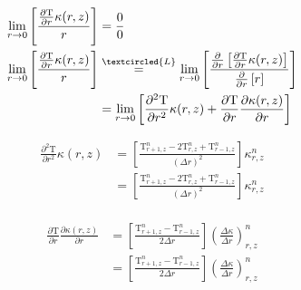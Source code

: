 \documentclass[12pt]{article}
\begin{document}
      \begin{equation}
        \begin{aligned}
          \lim_{r\rightarrow 0} \left [ \frac{\frac{\partial\mathrm{T}}{\partial r}\kappa(r, z)}{r} \right ] &= \frac{0}{0} \\
          \lim_{r\rightarrow 0} \left [ \frac{\frac{\partial\mathrm{T}}{\partial r}\kappa(r, z)}{r} \right ] &\overset{\textcircled{L}}= \lim_{r\rightarrow 0} \left [ \frac{\frac{\partial}{\partial r} \left [\frac{\partial\mathrm{T}}{\partial r}\kappa(r, z)  \right ]}{\frac{\partial}{\partial r}\left [ r \right ]} \right ] \\
          &= \lim_{r\rightarrow 0} \left [ \frac{\partial^2\mathrm{T}}{\partial r^2}\kappa(r, z)  + \frac{\partial\mathrm{T}}{\partial r}\frac{\partial\kappa(r, z)}{\partial r}\right ] \\
        \end{aligned}
      \end{equation}

      \begin{equation}
        \begin{aligned}
          \frac{\partial^2\mathrm{T}}{\partial r^2}\kappa(r, z) &= \left [\frac{\mathrm{T}^{n}_{r + 1, z}  - 2 \mathrm{T}^{n}_{r, z} +  \mathrm{T}^{n}_{r - 1, z}}{(\Delta r)^2} \right ] \kappa^n_{r, z} \\
           &= \left [\frac{\mathrm{T}^{n}_{r + 1, z}  - 2 \mathrm{T}^{n}_{r, z} +  \mathrm{T}^{n}_{r - 1, z}}{(\Delta r)^2} \right ] \kappa^n_{r, z} \\
        \end{aligned}
      \end{equation}

      \begin{equation}
        \begin{aligned}
          \frac{\partial\mathrm{T}}{\partial r}\frac{\partial\kappa(r, z)}{\partial r} &= \left [\frac{\mathrm{T}^{n}_{r + 1, z} - \mathrm{T}^{n}_{r - 1, z}}{2\Delta r}  \right ](\frac{\Delta\kappa}{\Delta r})^n_{r, z} \\
           &= \left [\frac{\mathrm{T}^{n}_{r + 1, z} - \mathrm{T}^{n}_{r - 1, z}}{2\Delta r}  \right ](\frac{\Delta\kappa}{\Delta r})^n_{r, z} \\
        \end{aligned}
      \end{equation}
\end{document}
